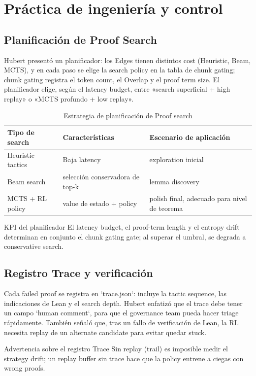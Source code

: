\section{Práctica de ingeniería y control}

\subsection{Planificación de Proof Search}
Hubert presentó un planificador: los Edges tienen distintos cost (Heuristic, Beam, MCTS), y en cada paso se elige la search policy en la tabla de chunk gating; chunk gating registra el token count, el Overlap y el proof term size. El planificador elige, según el latency budget, entre «search superficial + high replay» o «MCTS profundo + low replay».
\begin{table}[H]
\centering
\begin{tabular}{p{4cm}p{4cm}p{4cm}}
\toprule
Tipo de search & Características & Escenario de aplicación \\
\midrule
Heuristic tactics & Baja latency & exploration inicial \\
Beam search & selección conservadora de top-k & lemma discovery \\
MCTS + RL policy & value de estado + policy & polish final, adecuado para nivel de teorema \\
\bottomrule
\end{tabular}
\caption{Estrategia de planificación de Proof search}
\end{table}
\begin{importantbox}{KPI del planificador}
El latency budget, el proof-term length y el entropy drift determinan en conjunto el chunk gating gate; al superar el umbral, se degrada a conservative search.
\end{importantbox}

\subsection{Registro Trace y verificación}
Cada failed proof se registra en `trace.json`: incluye la tactic sequence, las indicaciones de Lean y el search depth. Hubert enfatizó que el trace debe tener un campo `human comment`, para que el governance team pueda hacer triage rápidamente. También señaló que, tras un fallo de verificación de Lean, la RL necesita replay de un alternate candidate para evitar quedar stuck.
\begin{warningbox}{Advertencia sobre el registro Trace}
Sin replay (trail) es imposible medir el strategy drift; un replay buffer sin trace hace que la policy entrene a ciegas con wrong proofs.
\end{warningbox}


